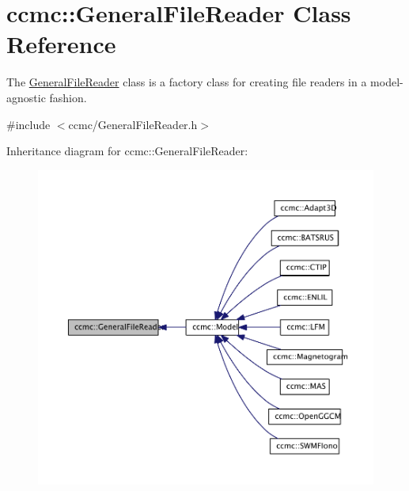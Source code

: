 \hypertarget{classccmc_1_1_general_file_reader}{\section{ccmc\-:\-:General\-File\-Reader Class Reference}
\label{classccmc_1_1_general_file_reader}
}


The \hyperlink{classccmc_1_1_general_file_reader}{General\-File\-Reader} class is a factory class for creating file readers in a model-\/agnostic fashion.  




{\ttfamily \#include $<$ccmc/\-General\-File\-Reader.\-h$>$}



Inheritance diagram for ccmc\-:\-:General\-File\-Reader\-:\nopagebreak
\begin{figure}[H]
\begin{center}
\leavevmode
\includegraphics[width=350pt]{classccmc_1_1_general_file_reader__inherit__graph}
\end{center}
\end{figure}


